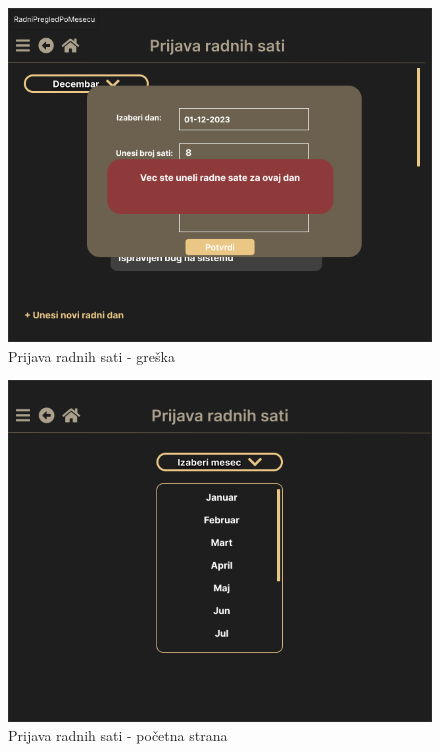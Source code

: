 \documentclass[a4paper]{article}
\begin{document}
\begin{figure} [!ht]
    \begin{center}
        \includegraphics[scale=0.25]{UI/Zaposleni/RadniSatiErrorInput.png}
    \end{center}
\caption{Prijava radnih sati - greška}
\end{figure}

\begin{figure} [!ht]
    \begin{center}
        \includegraphics[scale=0.25]{UI/Zaposleni/RadniSatiPocetna.png}
    \end{center}
\caption{Prijava radnih sati - početna strana}
\end{figure}
\end{document}
